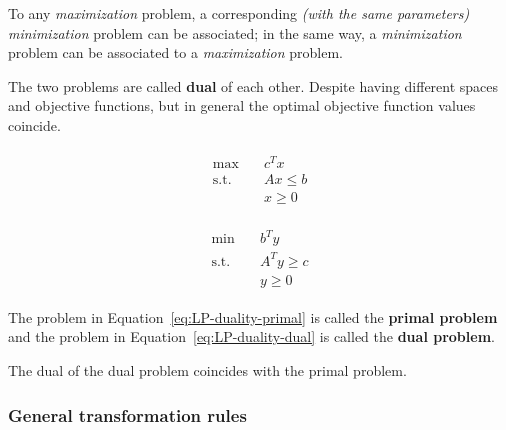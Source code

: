 \documentclass[english]{article}
\begin{document}
To any \textit{maximization} \LP problem, a corresponding \textit{(with the same parameters)} \textit{minimization} problem can be associated;
in the same way, a \textit{minimization} problem can be associated to a \textit{maximization} problem.

The two problems are called \textbf{dual} of each other.
Despite having different spaces and objective functions, but in general the optimal objective function values coincide.

\bigskip
\begin{minipage}{0.3\textwidth}
  \begin{gather}
    \begin{aligned}
      \max        & \quad c^T x     \\
      \text{s.t.} & \quad Ax \leq b \\
                  & \quad x \geq 0
    \end{aligned}
    \label{eq:LP-duality-primal}
  \end{gather}
\end{minipage}
\hspace{0.3\textwidth}
\begin{minipage}{0.3\textwidth}
  \begin{gather}
    \begin{aligned}
      \min        & \quad b^T y        \\
      \text{s.t.} & \quad A^T y \geq c \\
                  & \quad y \geq 0
    \end{aligned}
    \label{eq:LP-duality-dual}
  \end{gather}
\end{minipage}

\bigskip
\begin{definition}
  The problem in Equation~\ref{eq:LP-duality-primal} is called the \textbf{primal problem} and the problem in Equation~\ref{eq:LP-duality-dual} is called the \textbf{dual problem}.
\end{definition}

\begin{property}
  The dual of the dual problem coincides with the primal problem.
\end{property}

\subsubsection{General transformation rules}
\end{document}
